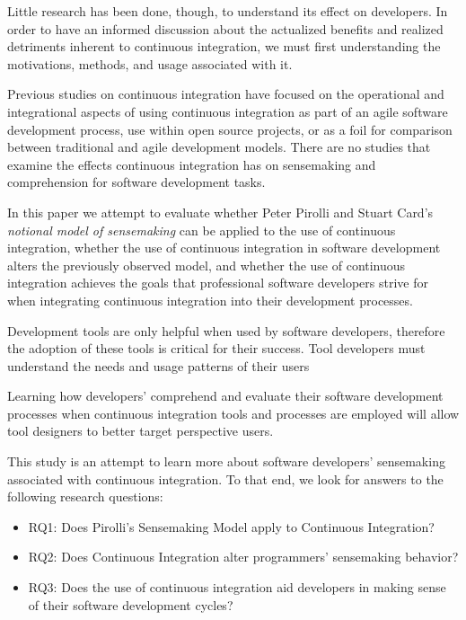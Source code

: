 \documentclass{sig-alternate}
\begin{document}
Little research has been done, though, to understand its effect on developers. In order to have an informed discussion about the actualized benefits and realized detriments inherent to continuous integration, we must first understanding the motivations, methods, and usage associated with it.

Previous studies on continuous integration have focused on the operational and integrational aspects of using continuous integration as part of an agile software development process\cite{miller:hundreddays}\cite{olsson:climbingstairway}, use within open source projects\cite{deshpande:ci_opensource}, or as a foil for comparison between traditional and agile development models\cite{staahl:modelingdiffs}. There are no studies that examine the effects continuous integration has on sensemaking and comprehension for software development tasks.

In this paper we attempt to evaluate whether Peter Pirolli and Stuart Card's \textit{notional model of sensemaking}\cite{pirolli:sensemaking} can be applied to the use of continuous integration, whether the use of continuous integration in software development alters the previously observed model, and whether the use of continuous integration achieves the goals that professional software developers strive for when integrating continuous integration into their development processes.

Development tools are only helpful when used by software developers, therefore the adoption of these tools is critical for their success. Tool developers must understand the needs and usage patterns of their users

Learning how developers' comprehend and evaluate their software development processes when continuous integration tools and processes are employed will allow tool designers to better target perspective users.

This study is an attempt to learn more about software developers' sensemaking associated with continuous integration. To that end, we look for answers to the following research questions:
\begin{itemize}
\item RQ1: Does Pirolli's Sensemaking Model apply to Continuous Integration?
\item RQ2: Does Continuous Integration alter programmers' sensemaking behavior?
\item RQ3: Does the use of continuous integration aid developers in making sense of their software development cycles?

\end{itemize}
\end{document}
